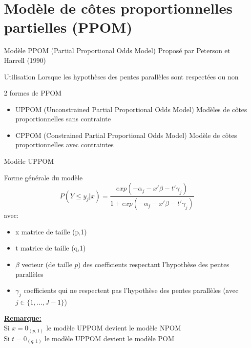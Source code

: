 \documentclass[11pt]{beamer}
\begin{document}
	\section{Modèle de côtes proportionnelles partielles (PPOM)}
	\begin{frame}{Modèle PPOM (Partial Proportional Odds Model)}
		Proposé par Peterson et Harrell (1990)
		\begin{block}{Utilisation}
			Lorsque les hypothèses des pentes parallèles sont respectées ou non
		\end{block}
		\begin{block}{2 formes de PPOM}
			\begin{itemize}
				\item UPPOM (Unconstrained Partial Proportional Odds Model) Modèles de côtes proportionnelles sans contrainte
				\item CPPOM (Constrained Partial Proportional Odds Model) Modèle de côtes proportionnelles avec contraintes
			\end{itemize}
		\end{block}
	\end{frame}
	
	\begin{frame}{Modèle UPPOM}
		\scriptsize
		\begin{block}{Forme générale du modèle}
			\[
			P(Y \leq y_j | x) = \frac{exp(- \alpha_j - x' \beta - t' \gamma_j)}{1 + exp(- \alpha_j - x' \beta - t' \gamma_j)}
			\]
			avec:
			\begin{itemize}
				\item x matrice de taille (p,1)
				\item t matrice de taille (q,1)
				\item $\beta$ vecteur (de taille $p$) des coefficients respectant l'hypothèse des pentes parallèles
				\item $\gamma_j$ coefficients qui ne respectent pas l'hypothèse des pentes parallèles (avec $j \in \{1, \dots ,J-1\}$)
			\end{itemize}
		\end{block}
		\textbf{\underline{Remarque:}} \\
		\vspace{2mm}
		Si $x = 0_{(p,1)}$ le modèle UPPOM devient le modèle NPOM \\
		Si $t = 0_{(q,1)}$ le modèle UPPOM devient le modèle POM
	\end{frame}
	
\end{document}

